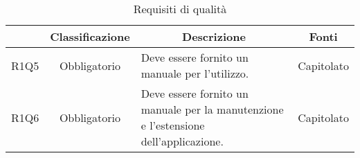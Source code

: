 \begin{table}[H]
    \centering
    \renewcommand{\arraystretch}{1.8}
    \begin{tabular}{c | c | p{6cm} | p{4.1cm}}
        \rowcolor[HTML]{125E28}
        \multicolumn{1}{c}{\color[HTML]{FFFFFF} \textbf{Codice}}            &
        \multicolumn{1}{c}{\color[HTML]{FFFFFF} \textbf{Classificazione}}   &
        \multicolumn{1}{c}{\color[HTML]{FFFFFF} \textbf{Descrizione}}       &
        \multicolumn{1}{c}{\color[HTML]{FFFFFF} \textbf{Fonti}}                                                                                                                                                                    \\
        \hline
        R1Q5                                                              & Obbligatorio & Deve essere fornito un manuale per l'utilizzo.                                                             & Capitolato \\
        R1Q6                                                              & Obbligatorio & Deve essere fornito un manuale per la manutenzione e l'estensione dell'applicazione.                       & Capitolato \\
    \end{tabular}
    \caption{Requisiti di qualità}
\end{table}

